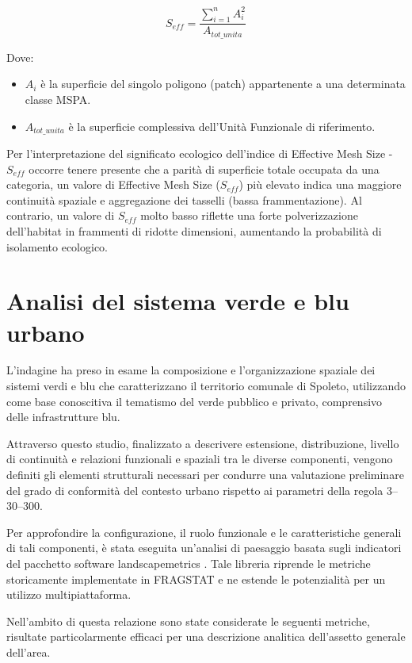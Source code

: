 \documentclass[
  a4paper,
]{book}
\providecommand{\tightlist}{%
  \setlength{\itemsep}{0pt}\setlength{\parskip}{0pt}}
\begin{document}
\[S_{eff} = \frac{\sum_{i=1}^{n} A_i^2}{A_{tot\_unita}}\]

Dove:

\begin{itemize}
\tightlist
\item
  \(A_i\) è la superficie del singolo poligono (patch) appartenente a una determinata classe MSPA.
\item
  \(A_{tot\_unita}\) è la superficie complessiva dell'Unità Funzionale di riferimento.
\end{itemize}

Per l'interpretazione del significato ecologico dell'indice di Effective Mesh Size - \(S_{eff}\) occorre tenere presente che a parità di superficie totale occupata da una categoria, un valore di Effective Mesh Size (\(S_{eff}\)) più elevato indica una maggiore continuità spaziale e aggregazione dei tasselli (bassa frammentazione).
Al contrario, un valore di \(S_{eff}\) molto basso riflette una forte polverizzazione dell'habitat in frammenti di ridotte dimensioni, aumentando la probabilità di isolamento ecologico.

\section{Analisi del sistema verde e blu urbano}\label{analisi-del-sistema-verde-e-blu-urbano}

L'indagine ha preso in esame la composizione e l'organizzazione spaziale dei sistemi verdi e blu che caratterizzano il territorio comunale di Spoleto, utilizzando come base conoscitiva il tematismo del verde pubblico e privato, comprensivo delle infrastrutture blu.

Attraverso questo studio, finalizzato a descrivere estensione, distribuzione, livello di continuità e relazioni funzionali e spaziali tra le diverse componenti, vengono definiti gli elementi strutturali necessari per condurre una valutazione preliminare del grado di conformità del contesto urbano rispetto ai parametri della regola 3--30--300.

Per approfondire la configurazione, il ruolo funzionale e le caratteristiche generali di tali componenti, è stata eseguita un'analisi di paesaggio basata sugli indicatori del pacchetto software landscapemetrics \citep{hesselbarth2019}.
Tale libreria riprende le metriche storicamente implementate in FRAGSTAT \citep{mcgarigalFragstatHelp2015} e ne estende le potenzialità per un utilizzo multipiattaforma.

Nell'ambito di questa relazione sono state considerate le seguenti metriche, risultate particolarmente efficaci per una descrizione analitica dell'assetto generale dell'area.
\end{document}
